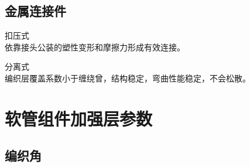 \subsection{金属连接件}
	\begin{asparaenum}
		\item 扣压式\\
		依靠接头公装的塑性变形和摩擦力形成有效连接。
		\item 分离式\\
		编织层覆盖系数小于缠绕曾，结构稳定，弯曲性能稳定，不会松散。
		
		\begin{figure}[!htbp]
			\centering
			\hspace{1cm}

			\label{fig:placeholder}
		\end{figure}
	\end{asparaenum}	
	





	




\section{软管组件加强层参数}
\label{sec:parameter}



\subsection{编织角}


